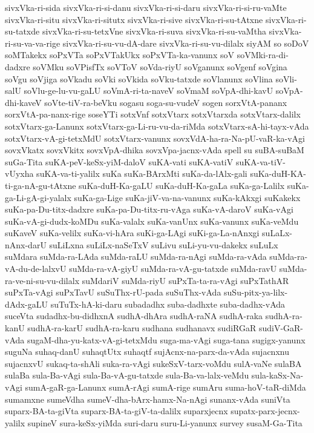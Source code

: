 {sivxVka-ri-sida
sivxVka-ri-si-danu
sivxVka-ri-si-daru
sivxVka-ri-si-ru-vaMte
sivxVka-ri-situ
sivxVka-ri-situtx
sivxVka-ri-sive
sivxVka-ri-su-tAtxne
sivxVka-ri-su-tatxde
sivxVka-ri-su-tetxVne
sivxVka-ri-suva
sivxVka-ri-su-vaMtha
sivxVka-ri-su-va-va-rige
sivxVka-ri-su-vu-dA-dare
sivxVka-ri-su-vu-dilalx
siyAM
so
soDoV
soMTakekx
soPxVTa
soPxVTakUkx
soPxVTa-ka-vanunx
soV
soVMki-ra-di-dadxre
soVMku
soVPisfTx
soVToV
soVda-riyU
soVganunx
soVgenf
soVgina
soVgu
soVjiga
soVkadu
soVki
soVkida
soVku-tatxde
soVlanunx
soVlina
soVli-salU
soVlu-ge-lu-vu-gaLU
soVmA-ri-ta-naveV
soVmaM
soVpA-dhi-kavU
soVpA-dhi-kaveV
soVte-tiV-ra-beVku
sogasu
soga-su-vudeV
sogen
sorxVtA-pananx
sorxVtA-pa-nanx-rige
soseYTi
sotxVnf
sotxVtarx
sotxVtarxda
sotxVtarx-dalilx
sotxVtarx-ga-Lanunx
sotxVtarx-ga-Li-ru-vu-da-riMda
sotxVtarx-sA-hi-tayx-vAda
sotxVtarx-vA-gi-tetxMdU
sotxVtarx-vanunx
sovxVdA-ha-ra-Na-pU-vaR-ka-vAgi
sovxVkatx
sovxVkitx
sovxVpA-dhika
sovxVpa-jacnx-vAda
spell
su
suBA-suBaM
suGa-Tita
suKA-peV-keSx-yiM-daloV
suKA-vati
suKA-vatiV
suKA-va-tiV-vUyxha
suKA-va-ti-yalilx
suKa
suKa-BArxMti
suKa-da-lAlx-gali
suKa-duH-KA-ti-ga-nA-gu-tAtxne
suKa-duH-Ka-gaLU
suKa-duH-Ka-gaLa
suKa-ga-Lalilx
suKa-ga-Li-gA-gi-yalalx
suKa-ga-Lige
suKa-jiV-va-na-vanunx
suKa-kAkxgi
suKakekx
suKa-pa-Du-titx-dadxre
suKa-pa-Du-titx-ru-vAga
suKa-vA-daroV
suKa-vAgi
suKa-vA-gi-dudx-koMDu
suKa-valalx
suKa-vanUnx
suKa-vanunx
suKa-veMdu
suKaveV
suKa-velilx
suKa-vi-hAra
suKi-ga-LAgi
suKi-ga-La-nAnxgi
suLaLx-nAnx-darU
suLiLxna
suLiLx-naSeTxV
suLivu
suLi-yu-vu-dakekx
suLuLx
suMdara
suMda-ra-LAda
suMda-raLU
suMda-ra-nAgi
suMda-ra-vAda
suMda-ra-vA-du-de-lalxvU
suMda-ra-vA-giyU
suMda-ra-vA-gu-tatxde
suMda-ravU
suMda-ra-ve-ni-su-vu-dilalx
suMdariV
suMda-riyU
suPxTa-ta-ra-vAgi
suPxTathAR
suPxTa-vAgi
suPxTavU
suSuThx-rU-pada
suSuThx-vAda
suSu-pitx-ya-lilx-dAdx-gaLU
suTuTx-hA-ki-daru
subadadhx
suba-dadhxte
suba-dadhx-vAda
suceVta
sudadhx-bu-didhxnA
sudhA-dhAra
sudhA-raNA
sudhA-raka
sudhA-ra-kanU
sudhA-ra-karU
sudhA-ra-karu
sudhana
sudhanavx
sudiRGaR
sudiV-GaR-vAda
sugaM-dha-yu-katx-vA-gi-tetxMdu
suga-ma-vAgi
suga-tana
sugigx-yanunx
suguNa
suhaq-danU
suhaqtUtx
suhaqtf
sujAcnx-na-parx-da-vAda
sujacnxnu
sujacnxvU
sukaq-ta-shAli
suka-ra-vAgi
sukeSxV-tarx-voMdu
sulA-vaNe
sulaBA
sulaBa
sula-Ba-vAgi
sula-Ba-vA-gu-tatxde
sula-Ba-va-lalx-veMdu
sula-kaSx-Na-vAgi
sumA-gaR-ga-Lanunx
sumA-rAgi
sumA-rige
sumAru
suma-hoV-taR-diMda
sumamxne
sumeVdha
sumeV-dha-bArx-hamx-Na-nAgi
sunanx-vAda
suniVta
suparx-BA-ta-giVta
suparx-BA-ta-giV-ta-dalilx
suparxjecnx
supatx-parx-jecnx-yalilx
supineV
sura-keSx-yiMda
suri-daru
suru-Li-yanunx
survey
susaM-Ga-Tita
}
